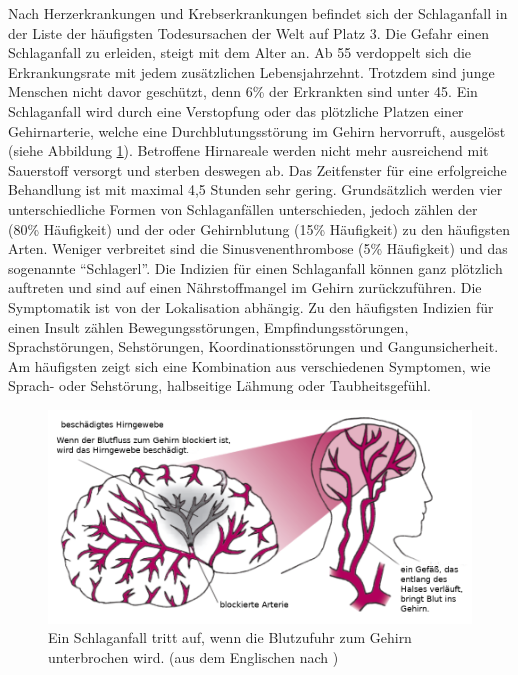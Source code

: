 Nach Herzerkrankungen und Krebserkrankungen befindet sich der Schlaganfall in der Liste der häufigsten Todesursachen der Welt auf Platz 3. Die Gefahr einen Schlaganfall zu erleiden, steigt mit dem Alter an. Ab 55 verdoppelt sich die Erkrankungsrate mit jedem zusätzlichen Lebensjahrzehnt. Trotzdem sind junge Menschen nicht davor geschützt, denn 6\% der Erkrankten sind unter 45. Ein Schlaganfall wird durch eine Verstopfung oder das plötzliche Platzen einer Gehirnarterie, welche eine Durchblutungsstörung im Gehirn hervorruft, ausgelöst (siehe Abbildung \ref{fig:stroke_cause}). Betroffene Hirnareale werden nicht mehr ausreichend mit Sauerstoff versorgt und sterben deswegen ab. Das Zeitfenster für eine erfolgreiche Behandlung ist mit maximal 4,5 Stunden sehr gering. Grundsätzlich werden vier unterschiedliche Formen von Schlaganfällen unterschieden, jedoch zählen der  (80\% Häufigkeit) und der  oder Gehirnblutung (15\% Häufigkeit) zu den häufigsten Arten. Weniger verbreitet sind die Sinusvenenthrombose (5\% Häufigkeit) und das sogenannte \enquote{Schlagerl}. Die Indizien für einen Schlaganfall können ganz plötzlich auftreten und sind auf einen Nährstoffmangel im Gehirn zurückzuführen. Die Symptomatik ist von der Lokalisation abhängig. Zu den häufigsten Indizien für einen Insult zählen Bewegungsstörungen, Empfindungsstörungen, Sprachstörungen, Sehstörungen, Koordinationsstörungen und Gangunsicherheit. Am häufigsten zeigt sich eine Kombination aus verschiedenen Symptomen, wie Sprach- oder Sehstörung, halbseitige Lähmung oder Taubheitsgefühl. \cite{haring:2014:insult}

\begin{figure}[h]
    \centering
	\includegraphics[width=1\linewidth]{figures/stroke/stroke_cause_deu}
	\caption{Ein Schlaganfall tritt auf, wenn die Blutzufuhr zum Gehirn unterbrochen wird. (aus dem Englischen nach \cite{world:2005:avoiding})}
	\label{fig:stroke_cause}
\end{figure}

